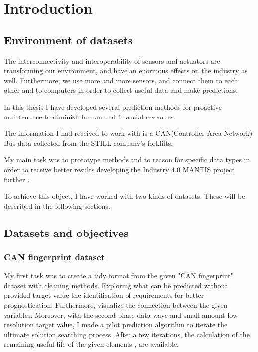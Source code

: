 \chapter{Introduction}
\section{Environment of datasets}
The interconnectivity and interoperability \cite{TalebArchInsSys} of sensors and actuators are transforming our environment, and have an enormous effects on the industry as well. Furthermore, we use more and more sensors, and connect them to each other and to computers in order to collect useful data and make predictions.

In this thesis I have developed several prediction methods for proactive maintenance to diminish human and financial resources.

The information I had received to work with is a CAN(Controller Area Network)-Bus data collected from the STILL company's forklifts.

My main task was to prototype methods and to reason for specific data types in order to receive better results developing the Industry 4.0 \cite{Indfourpointzero} MANTIS project further \cite{PaliHCsCPS,HCsCPS2,GartnerIoT,HuangCPS,PaliCPS,HCsCPS,ProMain}.

To achieve this object, I have worked with two kinds of datasets. These will be described in the following sections.
\section{Datasets and objectives}
    \subsection{CAN fingerprint dataset}
\noindent
My first task was to create a tidy format from the given "CAN fingerprint" dataset with cleaning methods. Exploring what can be predicted without provided target value  the identification of requirements for better prognostication. Furthermore, visualize the connection between the given variables. Moreover, with the second phase data wave and small amount low resolution target value, I made a pilot prediction algorithm to iterate the ultimate solution searching process. 
\noindent
After a few iterations, the calculation of the remaining useful life of the given elements , are available. 
